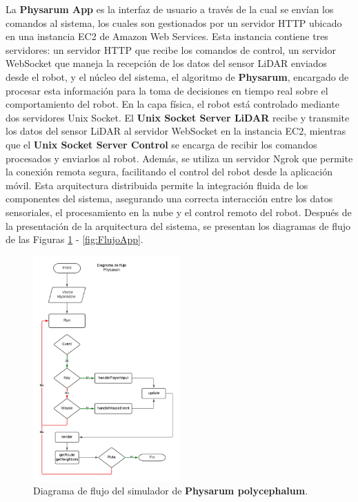         \vskip 0.5cm
        La \textbf{Physarum App} es la interfaz de usuario a trav\'es de la cual se env\'ian los comandos al sistema, 
        los cuales son gestionados por un servidor HTTP ubicado en una instancia EC2 de Amazon Web Services. Esta instancia 
        contiene tres servidores: un servidor HTTP que recibe los comandos de control, un servidor WebSocket que maneja la 
        recepci\'on de los datos del sensor LiDAR enviados desde el robot, y el n\'ucleo del sistema, el algoritmo de \textbf{Physarum},
        encargado de procesar esta informaci\'on para la toma de decisiones en tiempo real sobre el comportamiento del robot.
        \vskip 0.5cm
        En la capa f\'isica, el robot est\'a controlado 
        mediante dos servidores Unix Socket. El \textbf{Unix Socket Server LiDAR} recibe 
        y transmite los datos del sensor LiDAR al servidor WebSocket en la instancia EC2, 
        mientras que el \textbf{Unix Socket Server Control} se encarga de recibir los comandos procesados y enviarlos al robot. 
        Adem\'as, se utiliza un servidor Ngrok que permite la conexi\'on remota segura, facilitando el control del robot desde 
        la aplicaci\'on m\'ovil.
        \vskip 0.5cm
        Esta arquitectura distribuida permite la integraci\'on fluida de los componentes del sistema, 
        asegurando una correcta interacci\'on entre los datos sensoriales, el procesamiento en la nube y el control 
        remoto del robot.
        \vskip 0.5cm
        Despu\'es de la presentaci\'on de la arquitectura del sistema, se presentan los diagramas de flujo de las Figuras
        \ref{fig:FlujoSimulador} - \ref{fig:FlujoApp}.
        \vskip 0.5cm
            \begin{figure}[htbp]
                \centering
                \includegraphics[width=0.5\textwidth]{images/desarrollo/diagramas/FlujoSim.png}
                \caption{Diagrama de flujo del simulador de \textbf{Physarum polycephalum}.}
                \label{fig:FlujoSimulador}
            \end{figure}
        \vskip 0.5cm

